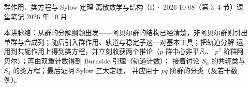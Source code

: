 \documentclass[cjk]{loom}
\begin{document}
\loomcover
  {群作用、类方程与 Sylow 定理}
  {离散数学与结构（I）· 2026-10-08（第 3--4 节）课堂笔记}
  {}
  {2026 年 10 月}

\begin{strand}
本讲脉络：从群的分解纲领出发——阿贝尔群的结构已经清楚，非阿贝尔群则引出
单群与合成列；随后引入群作用、轨道与稳定子这一对基本工具；把轨道分解
运用到共轭作用上得到类方程，并立刻收获两个推论（$p$-群中心非平凡、
$p^2$ 阶群阿贝尔）；再由双重计数得到 Burnside 引理（轨道计数）；
接着讨论 $S_n$ 的共轭类与 $S_4$ 的类方程；最后证明 Sylow 三大定理，
并应用于 $pq$ 阶群的分类（及若干数例）。
\end{strand}

\clearpage
{\small\tableofcontents}

\clearpage






\end{document}
